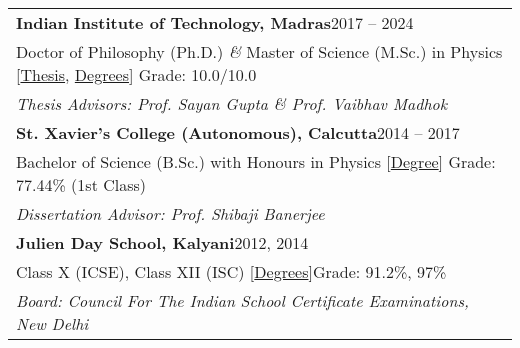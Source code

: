 
\noindent
\begin{tabular}{@{} m{18.5cm}}
\textbf{Indian Institute of Technology, Madras}\hfill 2017 -- 2024\\
Doctor of Philosophy (Ph.D.) \textit{\&} Master of Science (M.Sc.) in Physics [\href{https://shodhganga.inflibnet.ac.in/handle/10603/609844}{Thesis}, \href{https://drive.google.com/file/d/1e_EdV3adnDxSkRCMAQGF4_j8DAEQHmok/view?usp=sharing}{Degrees}] \hfill Grade: 10.0/10.0\\
\textit{Thesis Advisors: Prof. Sayan Gupta \& Prof. Vaibhav Madhok}\\[0.3cm]

\textbf{St. Xavier's College (Autonomous), Calcutta}\hfill 2014 -- 2017\\
Bachelor of Science (B.Sc.) with Honours in Physics [\href{https://drive.google.com/file/d/1kzH1EiCFbbcnvpbOTWJMMhiCC53tkvDD/view?usp=sharing}{Degree}] \hfill Grade: 77.44\% (1st Class)\\
\textit{Dissertation Advisor: Prof. Shibaji Banerjee}\\[0.3cm]

\textbf{Julien Day School, Kalyani}\hfill 2012, 2014\\
Class X (ICSE), Class XII (ISC) [\href{https://drive.google.com/file/d/1rBzB5cY0d9NKxEajnIj6dx8uzIBc41sh/view?usp=sharing}{Degrees}]\hfill Grade: 91.2\%, 97\%\\
\textit{Board: Council For The Indian School Certificate Examinations, New Delhi}
\end{tabular}